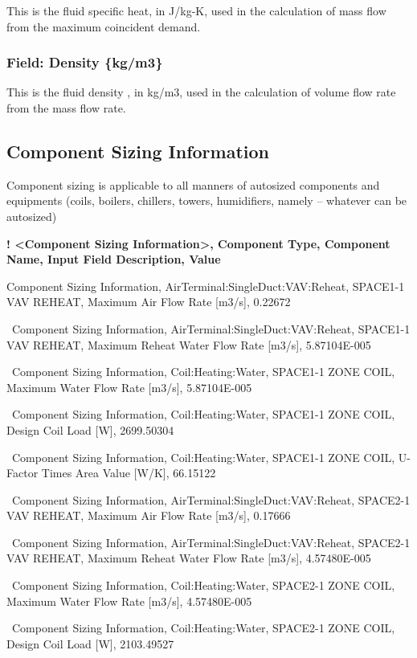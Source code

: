 This is the fluid specific heat, in J/kg-K, used in the calculation of mass flow from the maximum coincident demand.

\subsubsection{Field: Density \{kg/m3\}}\label{field-density-kgm3}

This is the fluid density , in kg/m3, used in the calculation of volume flow rate from the mass flow rate.

\subsection{Component Sizing Information}\label{component-sizing-information}

Component sizing is applicable to all manners of autosized components and equipments (coils, boilers, chillers, towers, humidifiers, namely -- whatever can be autosized)

\textbf{! \textless{}Component Sizing Information\textgreater{}, Component Type, Component Name, Input Field Description, Value}

Component Sizing Information, AirTerminal:SingleDuct:VAV:Reheat, SPACE1-1 VAV REHEAT, Maximum Air Flow Rate {[}m3/s{]}, 0.22672

~Component Sizing Information, AirTerminal:SingleDuct:VAV:Reheat, SPACE1-1 VAV REHEAT, Maximum Reheat Water Flow Rate {[}m3/s{]}, 5.87104E-005

~Component Sizing Information, Coil:Heating:Water, SPACE1-1 ZONE COIL, Maximum Water Flow Rate {[}m3/s{]}, 5.87104E-005

~Component Sizing Information, Coil:Heating:Water, SPACE1-1 ZONE COIL, Design Coil Load {[}W{]}, 2699.50304

~Component Sizing Information, Coil:Heating:Water, SPACE1-1 ZONE COIL, U-Factor Times Area Value {[}W/K{]}, 66.15122

~Component Sizing Information, AirTerminal:SingleDuct:VAV:Reheat, SPACE2-1 VAV REHEAT, Maximum Air Flow Rate {[}m3/s{]}, 0.17666

~Component Sizing Information, AirTerminal:SingleDuct:VAV:Reheat, SPACE2-1 VAV REHEAT, Maximum Reheat Water Flow Rate {[}m3/s{]}, 4.57480E-005

~Component Sizing Information, Coil:Heating:Water, SPACE2-1 ZONE COIL, Maximum Water Flow Rate {[}m3/s{]}, 4.57480E-005

~Component Sizing Information, Coil:Heating:Water, SPACE2-1 ZONE COIL, Design Coil Load {[}W{]}, 2103.49527

